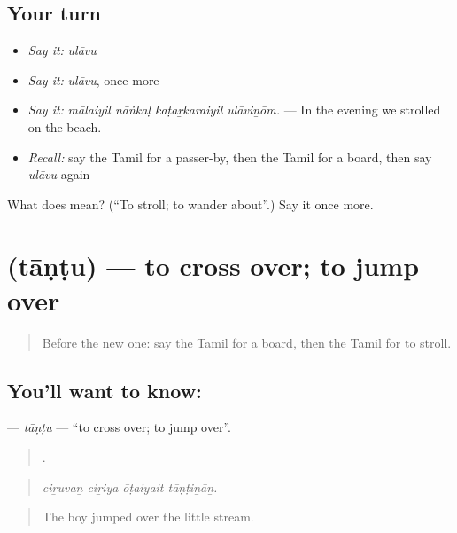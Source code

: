 \subsection*{Your turn}
\begin{itemize}
\raggedright
  \item \emph{Say it:} \emph{ulāvu}
  \item \emph{Say it:} \emph{ulāvu}, once more
  \item \emph{Say it:} \emph{mālaiyil nāṅkaḷ kaṭaṟkaraiyil ulāviṉōm.} — In the evening we strolled on the beach.
  \item \emph{Recall:} say the Tamil for a passer-by, then the Tamil for a board, then say \emph{ulāvu} again
\end{itemize}

\begin{tcolorbox}[breakable,colback=teal!4,colframe=teal!35!black,title={Before you move on}]
What does  mean? (\textquotedblleft{}To stroll; to wander about\textquotedblright{}.) Say it once more.
\end{tcolorbox}
\section[\texorpdfstring{\ta{தாண்டு} (tāṇṭu)}{தாண்டு (tāṇṭu)}]{ (tāṇṭu) — to cross over; to jump over}

\label{lesson:TA-C410-tantu}



\begin{quote}
Before the new one: say the Tamil for a board, then the Tamil for to stroll.
\end{quote}

\subsection*{You'll want to know: }
\textbf{} — \emph{tāṇṭu} — \textquotedblleft{}to cross over; to jump over\textquotedblright{}.

\begin{quote}
   .
\end{quote}

\begin{quote}
\emph{ciṟuvaṉ ciṟiya ōṭaiyait tāṇṭiṉāṉ.}
\end{quote}

\begin{quote}
The boy jumped over the little stream.
\end{quote}

